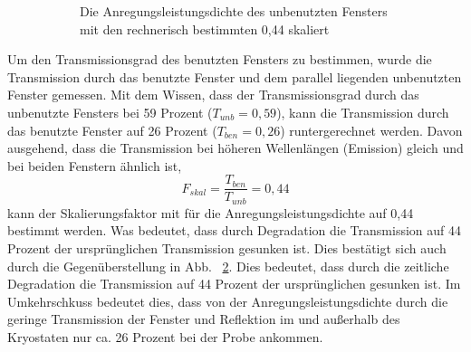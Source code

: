 \begin{figure}[htb]
\begin{subfigure}{0.40\textwidth}
    \caption{Die Anregungsleistungsdichte des unbenutzten Fensters mit den rechnerisch bestimmten 0,44 skaliert}
    \label{fig:sub2}
  \end{subfigure}
  \caption{}
  \label{fig:vergleichSkaliert}
\end{figure}
%
Um den Transmissionsgrad des benutzten Fensters zu bestimmen, wurde die Transmission durch das benutzte Fenster und dem parallel liegenden unbenutzten Fenster gemessen. Mit dem Wissen, dass der Transmissionsgrad durch das unbenutzte Fensters bei 59 Prozent ($T_{unb} = 0,59$), kann die Transmission durch das benutzte Fenster auf 26 Prozent ($T_{ben} = 0,26$) runtergerechnet werden. 
Davon ausgehend, dass die Transmission bei höheren Wellenlängen (Emission) gleich und bei beiden Fenstern ähnlich ist,
%
\begin{equation}
  F_{skal} = \frac{ T_{ben} }{ T_{unb} } = 0,44\label{eq11}
\end{equation}
%
kann der Skalierungsfaktor mit für die Anregungsleistungsdichte auf 0,44 bestimmt werden. Was bedeutet, dass durch Degradation die Transmission auf 44 Prozent der ursprünglichen Transmission gesunken ist.
Dies bestätigt sich auch durch die Gegenüberstellung in Abb. ~\ref{fig:vergleichSkaliert}. Dies bedeutet, dass durch die zeitliche Degradation die Transmission auf 44 Prozent der ursprünglichen gesunken ist.
Im Umkehrschkuss bedeutet dies, dass von der Anregungsleistungsdichte durch die geringe Transmission der Fenster und Reflektion im und außerhalb des Kryostaten nur ca. 26 Prozent bei der Probe ankommen. 